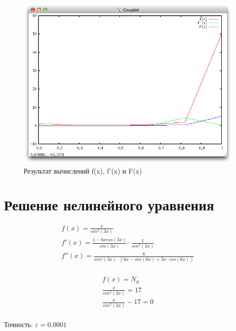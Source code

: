 \documentclass{article}
\begin{document}
\begin{figure}[h!]
    \includegraphics[width=13cm]{result_of_integ_diff.png}
    \caption{Результат вычислений f(x), f'(x) и F(x)}
    \label{interpolations_img}
  \end{figure}

\section{Решение нелинейного уравнения}

\begin{displaymath}
  \begin{array}{ccc}
    f(x) = \frac{x}{sin^2(3x)}  \\
    f'(x) = \frac{1 - 6x cos(3x)}{sin(3 x)} \cdot \frac{1}{sin^2(3 x)}\\
    f''(x) = \frac{6}{sin^4(3x) \cdot (6x - sin(6x) + 3x \cdot cos(6x))}\\
  \end{array}
\end{displaymath}

\begin{displaymath}
  \begin{array}{ccc}
    f(x) = N_{g}  \\
    \frac{x}{sin^2(3x)}= 17 \\
    \frac{x}{sin^2(3x)} - 17 = 0 \\
  \end{array}
\end{displaymath}

Точность: $\varepsilon = 0.0001$
\end{document}

